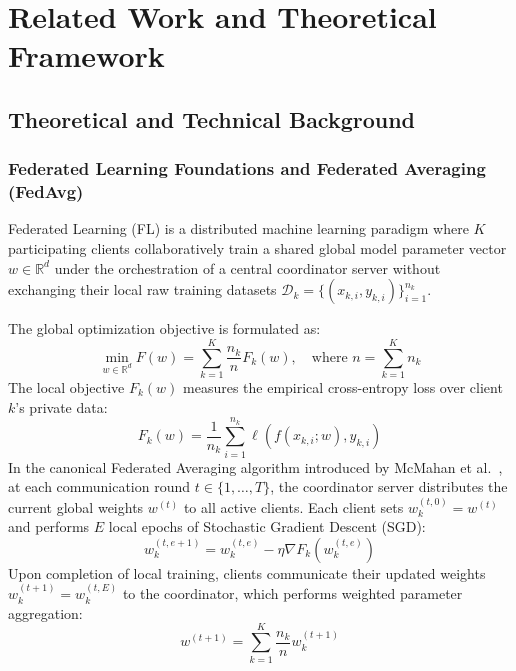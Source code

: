 \documentclass[applsci,article,submit,oneauthor,pdftex]{Definitions/mdpi}
\begin{document}
\section{Related Work and Theoretical Framework}
\label{sec:related_work}

\subsection{Theoretical and Technical Background}

\subsubsection{Federated Learning Foundations and Federated Averaging (FedAvg)}
Federated Learning (FL) is a distributed machine learning paradigm where $K$ participating clients collaboratively train a shared global model parameter vector $w \in \mathbb{R}^d$ under the orchestration of a central coordinator server without exchanging their local raw training datasets $\mathcal{D}_k = \{(x_{k,i}, y_{k,i})\}_{i=1}^{n_k}$.

The global optimization objective is formulated as:
\begin{equation}
\min_{w \in \mathbb{R}^d} F(w) = \sum_{k=1}^{K} \frac{n_k}{n} F_k(w), \quad \text{where } n = \sum_{k=1}^{K} n_k
\label{eq:fl_global_obj}
\end{equation}
The local objective $F_k(w)$ measures the empirical cross-entropy loss over client $k$'s private data:
\begin{equation}
F_k(w) = \frac{1}{n_k} \sum_{i=1}^{n_k} \ell(f(x_{k,i}; w), y_{k,i})
\label{eq:fl_local_obj}
\end{equation}
In the canonical Federated Averaging algorithm introduced by McMahan et al.~\cite{mcmahan2017communication}, at each communication round $t \in \{1, \dots, T\}$, the coordinator server distributes the current global weights $w^{(t)}$ to all active clients. Each client sets $w_k^{(t, 0)} = w^{(t)}$ and performs $E$ local epochs of Stochastic Gradient Descent (SGD):
\begin{equation}
w_k^{(t, e+1)} = w_k^{(t, e)} - \eta \nabla F_k(w_k^{(t, e)})
\label{eq:local_sgd}
\end{equation}
Upon completion of local training, clients communicate their updated weights $w_k^{(t+1)} = w_k^{(t, E)}$ to the coordinator, which performs weighted parameter aggregation:
\begin{equation}
w^{(t+1)} = \sum_{k=1}^{K} \frac{n_k}{n} w_k^{(t+1)}
\label{eq:fedavg_agg}
\end{equation}
\end{document}

